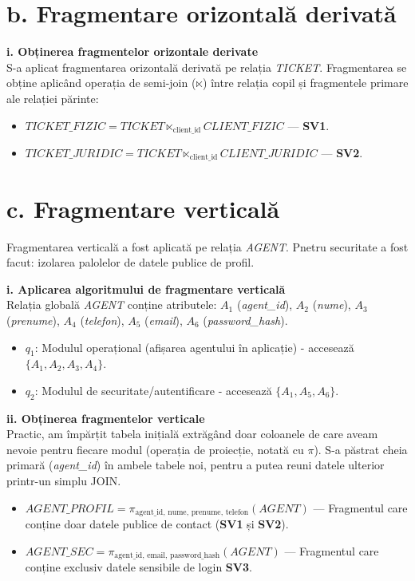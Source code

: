 \section*{b. Fragmentare orizontală derivată}

\textbf{i. Obținerea fragmentelor orizontale derivate}\\
S-a aplicat fragmentarea orizontală derivată pe relația \textit{TICKET}. Fragmentarea se obține aplicând operația de semi-join ($\ltimes$) între relația copil și fragmentele primare ale relației părinte:
\begin{itemize}
    \item $TICKET\_FIZIC = TICKET \ltimes_{\text{client\_id}} CLIENT\_FIZIC$ --- \textbf{SV1}.
    \item $TICKET\_JURIDIC = TICKET \ltimes_{\text{client\_id}} CLIENT\_JURIDIC$ --- \textbf{SV2}.
\end{itemize}

\section*{c. Fragmentare verticală}

Fragmentarea verticală a fost aplicată pe relația \textit{AGENT}. Pnetru securitate a fost facut: izolarea palolelor de datele publice de profil.

\textbf{i. Aplicarea algoritmului de fragmentare verticală}\\
Relația globală \textit{AGENT} conține atributele: $A_1$ (\textit{agent\_id}), $A_2$ (\textit{nume}), $A_3$ (\textit{prenume}), $A_4$ (\textit{telefon}), $A_5$ (\textit{email}), $A_6$ (\textit{password\_hash}).

\begin{itemize}
    \item $q_1$: Modulul operațional (afișarea agentului în aplicație) - accesează $\{A_1, A_2, A_3, A_4\}$.
    \item $q_2$: Modulul de securitate/autentificare - accesează $\{A_1, A_5, A_6\}$.
\end{itemize}

\textbf{ii. Obținerea fragmentelor verticale}\\
Practic, am împărțit tabela inițială extrăgând doar coloanele de care aveam nevoie pentru fiecare modul (operația de proiecție, notată cu $\pi$). S-a păstrat cheia primară (\textit{agent\_id}) în ambele tabele noi, pentru a putea reuni datele ulterior printr-un simplu JOIN. 

\begin{itemize}
    \item $AGENT\_PROFIL = \pi_{\text{agent\_id, nume, prenume, telefon}}(AGENT)$ --- Fragmentul care conține doar datele publice de contact (\textbf{SV1} și \textbf{SV2}).
    \item $AGENT\_SEC = \pi_{\text{agent\_id, email, password\_hash}}(AGENT)$ --- Fragmentul care conține exclusiv datele sensibile de login \textbf{SV3}.
\end{itemize}